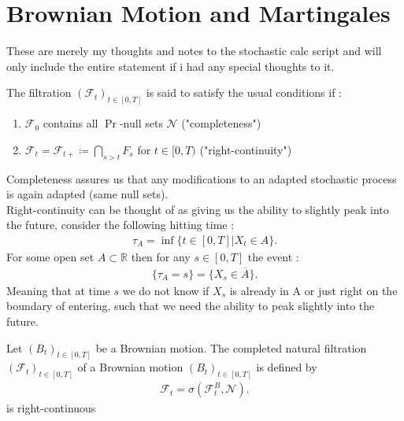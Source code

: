 \chapter{Brownian Motion and Martingales}
These are merely my thoughts and notes to the stochastic calc script and will only 
include the entire statement if i had any special thoughts to it. \\[1ex]

\begin{definition}
  The filtration $(\mathcal{F}_t)_{t \in [0,T]}$ is said to satisfy the usual conditions if : 
  \begin{enumerate}
    \item $\mathcal{F}_0$ contains all $\Pr$-null sets $\mathcal{N}$ ("completeness") 
    \item $\mathcal{F}_t = \mathcal{F}_{t+} \coloneqq \bigcap_{s>t} F_s$ for $t \in [0,T)$ ("right-continuity")
  \end{enumerate}
\end{definition}
\begin{remark}
 Completeness assures us that any modifications to an adapted stochastic process is again adapted (same null sets). \\
 Right-continuity can be thought of as giving us the ability to slightly peak into the future, consider the following hitting time :
 \begin{align*}
   \tau_A = \inf \{t \in [0,T] | X_t \in A\}
 .\end{align*}
 For some open set $A \subset  \mathbb{R}$ then for any $s \in  [0,T]$  the event : 
 \begin{align*}
   \{\tau_A = s\}   = \{X_s \in  \overline{A} \}  
 .\end{align*}
 Meaning that at time $s$ we do not know if $X_s$ is already in A or just right on the boundary of entering, such that we need the ability to peak slightly into
 the future.
\end{remark}
\begin{prop}
  Let $(B_t)_{t \in [0,T]}$  be a Brownian motion. The completed natural filtration $(\mathcal{F}_t)_{t \in  [0,T]}$ of a Brownian motion $(B_t)_{t \in [0,T]}$ is defined by  
  \begin{align*}
    \mathcal{F}_t =  \sigma(\mathcal{F}_t^{B},\mathcal{N} )
  .\end{align*}
  is right-continuous 
\end{prop}
